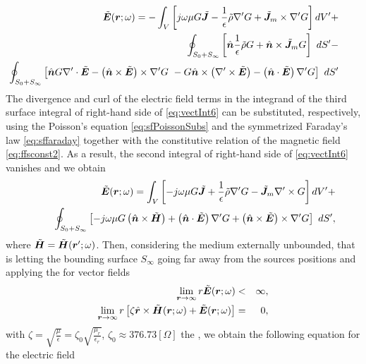 \begin{eqnarray}
\label{eq:vectInt6} %
& &\tilde{\mbfit{E}}(\mbfit{r}; \omega) = - \int_V \left [ j\omega\mu G \tilde{\mbfit{J}} - \frac{1}{\epsilon} \tilde{\rho} {\nabla}' G + \tilde{\mbfit{J}}_m \times {\nabla}' G \right ] dV' + \nonumber \\
& & \hspace{1cm} \oint_{S_0+S_{\infty}} \left [ \hat{\mbfit{n}} \frac{1}{\epsilon} \tilde{\rho} G + \hat{\mbfit{n}} \times \tilde{\mbfit{J}}_m G \right ] \ dS' -  \nonumber \\
& & \hspace{-1cm}\oint_{S_0+S_{\infty}} \left [ \hat{\mbfit{n}}  G {\nabla}' \cdot \tilde{\mbfit{E}}  - \left ( \hat{\mbfit{n}} \times \tilde{\mbfit{E}} \right ) \times {\nabla}'  G \ - G \hat{\mbfit{n}} \times \left ( {\nabla}' \times \tilde{\mbfit{E}} \right )  - \left ( \hat{\mbfit{n}} \cdot \tilde{\mbfit{E}}  \right ) {\nabla}' G \right ] \ dS'
\end{eqnarray} The divergence and curl of the electric field terms in the integrand of the third surface integral of right-hand side of \eqref{eq:vectInt6} can be substituted, respectively, using the Poisson's equation \eqref{eq:sfPoissonSubs} and the symmetrized Faraday's law \eqref{eq:sffaraday} together with the constitutive relation of the magnetic field \eqref{eq:ffsconst2}. As a result, the second integral of right-hand side of \eqref{eq:vectInt6} vanishes and we obtain
\begin{eqnarray}
\label{eq:StrattonChuE}
& &\tilde{\mbfit{E}}(\mbfit{r}; \omega) =  \int_V \left [ - j\omega\mu G \tilde{\mbfit{J}} + \frac{1}{\epsilon} \tilde{\rho} {\nabla}' G - \tilde{\mbfit{J}}_m {\nabla}' \times G \right ] dV' + \nonumber \\
& & \hspace{.5cm}\oint_{S_0+S_{\infty}} \left [ - j\omega \mu G \left ( \hat{\mbfit{n}} \times \tilde{\mbfit{H}} \right ) + \left ( \hat{\mbfit{n}} \cdot \tilde{\mbfit{E}} \right ) {\nabla}'  G + \left ( \hat{\mbfit{n}} \times \tilde{\mbfit{E}} \right ) \times {\nabla}' G  \right ] \ dS',
\end{eqnarray} where $\tilde{\mbfit{H}} = \tilde{\mbfit{H}}(\mbfit{r'}; \omega)$. Then, considering the medium externally unbounded, that is letting the bounding surface $S_\infty$ going far away from the sources positions and applying the  for vector fields \cite{RothwellCloudE}
\begin{eqnarray}
\lim_{\mbfit{r} \to \infty} r \tilde{\mbfit{E}}(\mbfit{r}; \omega)  &< &\infty,\\
\lim_{\mbfit{r} \to \infty} r \left [ \zeta \hat{\mbfit{r}} \times \tilde{\mbfit{H}}(\mbfit{r}; \omega) +  \tilde{\mbfit{E}}(\mbfit{r}; \omega) \right ] &= &0,
\end{eqnarray} with $\zeta = \sqrt{\frac{\mu}{\epsilon}} = \zeta_0 \sqrt{\frac{\mu_r}{\epsilon_r}}$, $\zeta_0 \approx 376.73 [\Omega]$ the , we obtain the following equation for the electric field
